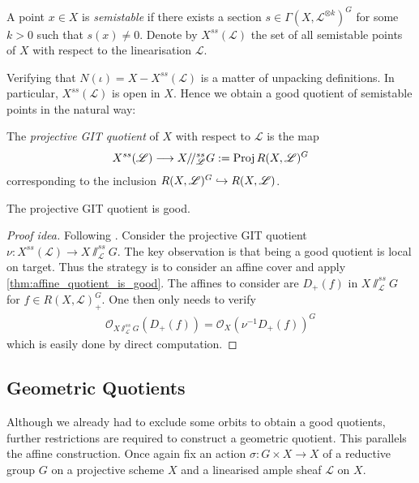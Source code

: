 \documentclass[12pt]{ociamthesis}  %
\begin{document}
\begin{definition}
  A point $x\in X$ is \emph{semistable} if there exists a section
  $s\in\Gamma(X,\mathscr L^{\otimes k})^G$ for some $k>0$ such that $s(x)\neq 0$.
  Denote by $X^{ss}(\mathscr L)$ the set of all semistable points of $X$
  with respect to the linearisation $\mathscr L$.
\end{definition}

Verifying that $N(\iota) = X - X^{ss}(\mathscr L)$ is a matter of unpacking definitions.
In particular, $X^{ss}(\mathscr L)$ is open in $X$. Hence we obtain a good quotient
of semistable points in the natural way:

\begin{definition}
  The \emph{projective GIT quotient} of $X$ with respect to $\mathscr L$ is the map
  \begin{align*}
    X^{ss}(\mathscr L) \longrightarrow X /\!/^{ss}_{\mathscr L} G := \operatorname{Proj} R(X,{\mathscr L})^G
  \end{align*}
  corresponding to the inclusion $R(X,{\mathscr L})^G\hookrightarrow R(X,{\mathscr L})$.
\end{definition}

\begin{theorem}
  The projective GIT quotient is good.
  \begin{proof}[Proof idea]
    Following \cite[Theorem 5.3]{hoskins2016}.
    Consider the projective GIT quotient
    $\nu : X^{ss}(\mathscr L)\to X\sslash^{ss}_{\mathscr L} G$.
    The key observation is that being a good quotient is local on target.
    Thus the strategy is to consider an affine cover and apply
    \ref{thm:affine_quotient_is_good}. The affines to consider
    are $D_+(f)$ in $X\sslash^{ss}_{\mathscr L} G$
    for $f\in R(X,\mathscr L)^G_+$. One then only needs to verify
    \begin{align*}
      \mathscr O_{X\sslash^{ss}_{\mathscr L} G}(D_+(f)) = \mathscr O_X(\nu^{-1} D_+(f))^G
    \end{align*}
    which is easily done by direct computation.
  \end{proof}
\end{theorem}

\subsection{Geometric Quotients}

Although we already had to exclude some orbits to obtain a good
quotients, further restrictions are required to construct a geometric
quotient. This parallels the affine construction.
Once again fix an action $\sigma : G\times X\to X$ of a
reductive group $G$ on a projective scheme $X$ and a linearised
ample sheaf $\mathscr L$ on $X$.
\end{document}
